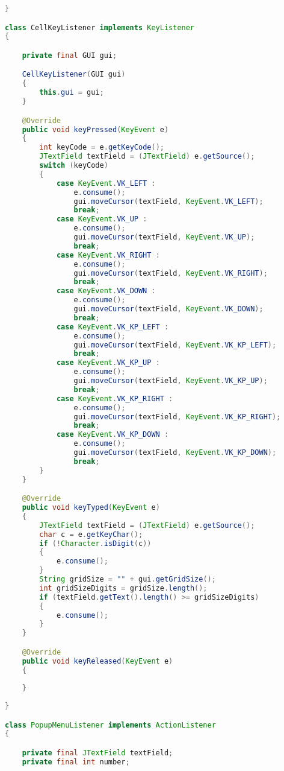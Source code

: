 \begin{lstlisting}[language=Java,basicstyle=\tiny,caption=GUI.java]
}

class CellKeyListener implements KeyListener
{

    private final GUI gui;

    CellKeyListener(GUI gui)
    {
        this.gui = gui;
    }

    @Override
    public void keyPressed(KeyEvent e)
    {
        int keyCode = e.getKeyCode();
        JTextField textField = (JTextField) e.getSource();        
        switch (keyCode)
        {
            case KeyEvent.VK_LEFT :
                e.consume();
                gui.moveCursor(textField, KeyEvent.VK_LEFT);
                break;
            case KeyEvent.VK_UP :
                e.consume();
                gui.moveCursor(textField, KeyEvent.VK_UP);
                break;
            case KeyEvent.VK_RIGHT :
                e.consume();
                gui.moveCursor(textField, KeyEvent.VK_RIGHT);
                break;
            case KeyEvent.VK_DOWN :
                e.consume();
                gui.moveCursor(textField, KeyEvent.VK_DOWN);
                break;
            case KeyEvent.VK_KP_LEFT :
                e.consume();
                gui.moveCursor(textField, KeyEvent.VK_KP_LEFT);
                break;
            case KeyEvent.VK_KP_UP :
                e.consume();
                gui.moveCursor(textField, KeyEvent.VK_KP_UP);
                break;
            case KeyEvent.VK_KP_RIGHT :
                e.consume();
                gui.moveCursor(textField, KeyEvent.VK_KP_RIGHT);
                break;
            case KeyEvent.VK_KP_DOWN :
                e.consume();
                gui.moveCursor(textField, KeyEvent.VK_KP_DOWN);
                break;
        }
    }

    @Override
    public void keyTyped(KeyEvent e)
    {
        JTextField textField = (JTextField) e.getSource();
        char c = e.getKeyChar();
        if (!Character.isDigit(c))
        {
            e.consume();
        }
        String gridSize = "" + gui.getGridSize();
        int gridSizeDigits = gridSize.length();
        if (textField.getText().length() >= gridSizeDigits)
        {
            e.consume();
        }
    }

    @Override
    public void keyReleased(KeyEvent e)
    {
        
    }
    
}

class PopupMenuListener implements ActionListener
{

    private final JTextField textField;
    private final int number;


\end{lstlisting}
